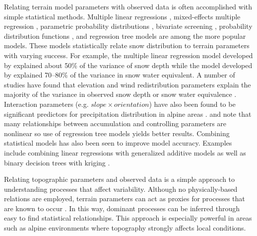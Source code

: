 \documentclass{sfuthesis}
\begin{document}
Relating terrain model parameters with observed data is often accomplished with simple statistical methods. Multiple linear regressions \citep{Marchand2005, Sold2013, McGrath2015}, mixed-effects multiple regression \citep{Kasurak2011}, parametric probability distributions \citep{Clark2011}, bivariate screening \citep{Anderton2004}, probability distribution functions \citep{Kerr2013}, and regression tree models \citep{Elder1998, Winstral2002, Molotch2005, Revuelto2014, Wetlaufer2016} are among the more popular models. These models statistically relate snow distribution to terrain parameters with varying success. For example, the multiple linear regression model developed by \cite{Sold2013} explained about 50$\%$ of the variance of snow depth while the model developed by \cite{Anderton2004} explained 70--80$\%$ of the variance in snow water equivalent. A number of studies have found that elevation and wind redistribution parameters explain the majority of the variance in observed snow depth or snow water equivalence \citep[e.g.][]{Erickson2005, Trujillo2009,Schirmer2011, Grunewald2014, McGrath2015}. Interaction parameters (e.g. $slope \times orientation$) have also been found to be significant predictors for precipitation distribution in alpine areas \citep{Basist1994}. \cite{Erxleben2002} and \cite{Molotch2005} note that many relationships between accumulation and controlling parameters are nonlinear so use of regression tree models yields better results. Combining statistical models has also been seen to improve model accuracy. Examples include combining linear regressions with generalized additive models \citep{Lopez2006} as well as binary decision trees with kriging \citep{Balk2000}. 

Relating topographic parameters and observed data is a simple approach to understanding processes that affect variability. Although no physically-based relations are employed, terrain parameters can act as proxies for processes that are known to occur \citep{McGrath2015}. In this way, dominant processes can be inferred through easy to find statistical relationships. This approach is especially powerful in areas such as alpine environments where topography strongly affects local conditions. 
\end{document}
